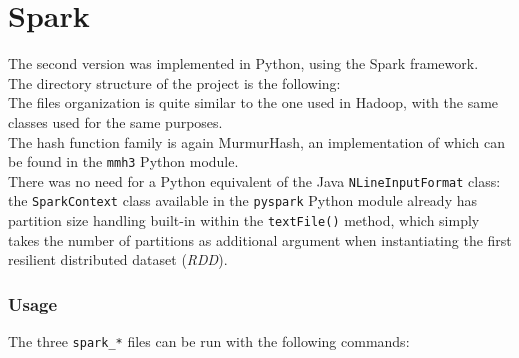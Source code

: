 %       
%
\chapter{Spark}\label{ch:spark}
The second version was implemented in Python, using the Spark framework.\\
The directory structure of the project is the following:\\
\hfill \break
The files organization is quite similar to the one used in Hadoop, with the same classes used for the same purposes.\\
The hash function family is again MurmurHash, an implementation of which can be found in the \texttt{mmh3} Python module.\\
There was no need for a Python equivalent of the Java \texttt{NLineInputFormat} class: the \texttt{SparkContext} class available in the \texttt{pyspark} Python module already has partition size handling built-in within the \texttt{textFile()} method, which simply takes the number of partitions as additional argument when instantiating the first resilient distributed dataset (\textit{RDD}).


\subsection*{Usage}
The three \texttt{spark\_*} files can be run with the following commands:\\

